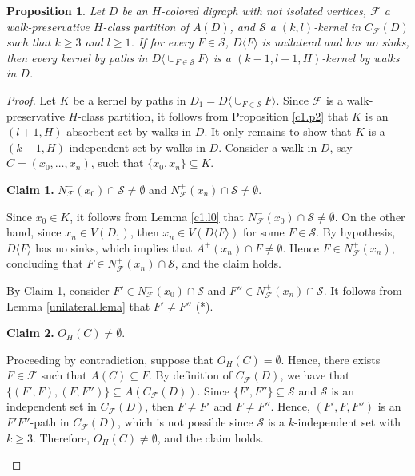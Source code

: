 \documentclass[10pt,a4paper]{article}
\newtheorem{prop}[theorem]{Proposition}
\begin{document}
\begin{prop}
\label{unilateraltheorem}
Let $D$ be an $H$-colored digraph with not isolated vertices, $\mathscr{F}$ a walk-preservative $H$-class partition of $A(D)$, and $\mathcal{S}$ a $(k,l)$-kernel in $C_{\mathscr{F}}(D)$ such that $k \geq 3$ and $l \geq 1$. If for every $F \in \mathcal{S}$, $D\langle F \rangle$ is unilateral and has no sinks, 
 then every kernel by paths in $D\langle \cup _{F \in \mathcal{S}} F \rangle$ is a $(k-1,l+1,H)$-kernel by walks in $D$.
\end{prop}
\begin{proof}
Let $K$ be a kernel by paths in $D_{1}= D\langle \cup_{F\in \mathcal{S}} F \rangle$.  Since $\mathscr{F}$ is a walk-preservative $H$-class partition, it follows from Proposition \ref{c1.p2} that $K$ is an $(l+1,H)$-absorbent set by walks in $D$. It only remains to show that $K$ is a $(k-1, H)$-independent set by walks in $D$.  Consider a walk in $D$, say $C=(x_{0}, \ldots , x_{n})$, such that $\{ x_{0}, x_{n} \} \subseteq K$.
	\begin{description}
	\item \textbf{Claim 1.}  $N^{-}_{\mathscr{F}}(x_{0}) \cap \mathcal{S} \neq \emptyset$ and $N^{+}_{\mathscr{F}}(x_{n}) \cap \mathcal{S} \neq \emptyset$.

	Since $x_{0} \in K$,  it follows from Lemma \ref{c1.l0} that  $N^{-}_{\mathscr{F}}(x_{0}) \cap \mathcal{S} \neq \emptyset$. On the other hand, since $x_{n} \in V(D_{1})$, then $x_{n} \in V(D \langle F \rangle )$ for some $F \in \mathcal{S}$. By hypothesis, $D \langle F \rangle$ has no sinks, which implies that $A^{+}(x_{n}) \cap F \neq \emptyset$. Hence $F \in N^{+}_{\mathscr{F}}(x_{n})$, concluding that  $F \in N^{+}_{\mathscr{F}}(x_{n}) \cap \mathcal{S}$, and the claim holds.
	\end{description}
	
By Claim 1, consider $F' \in N^{-}_{\mathscr{F}}(x_{0}) \cap \mathcal{S}$ and $F'' \in N^{+}_{\mathscr{F}}(x_{n}) \cap \mathcal{S}$. It follows from Lemma \ref{unilateral.lema} that $F' \neq F''$ (*).
	
	\begin{description}
	\item \textbf{Claim 2.} $O_{H}(C) \neq \emptyset$.
	
	Proceeding by contradiction, suppose that $O_{H}(C)= \emptyset$. Hence, there exists $F \in \mathscr{F}$ such that $A(C)\subseteq F$. By definition of $C_{\mathscr{F}}(D)$, we have that $\{ (F', F) , (F, F'') \} \subseteq A(C_{\mathscr{F}}(D))$. Since $\{ F', F'' \} \subseteq \mathcal{S}$ and $\mathcal{S}$ is an independent set in $C_{\mathscr{F}}(D)$, then $F \neq F'$ and $F \neq F''$. Hence, $(F', F, F'')$ is an $F'F''$-path in $C_{\mathscr{F}}(D)$, which is not possible since $\mathcal{S}$ is a $k$-independent set with $k \geq 3$. Therefore, $O_{H}(C) \neq \emptyset$, and the claim holds. 
	\end{description}


\end{proof}
\end{document}

